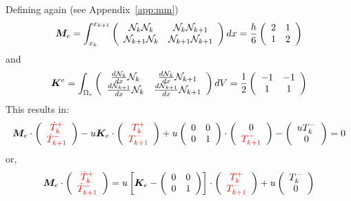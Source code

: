Defining again (see Appendix~\ref{app:mm})
\[
{\bm M}_e=
\int_{x_k}^{x_{k+1}}
\left(
\begin{array}{cc}
{\mathcal{N}}_k    {\mathcal{N}}_k & {\mathcal{N}}_k     {\mathcal{N}}_{k+1} \\
{\mathcal{N}}_{k+1}{\mathcal{N}}_k & {\mathcal{N}}_{k+1} {\mathcal{N}}_{k+1} 
\end{array}
\right)
dx
= 
\frac{h}{6}
\left(
\begin{array}{cc}
2  & 1 \\
1 & 2
\end{array}
\right)
\]
and 
\[
{\bm K}^e =
\int_{\Omega_e} 
\left(
\begin{array}{cc}
\frac{d{\mathcal{N}}_k}{dx}     {\mathcal{N}}_k & \frac{d{\mathcal{N}}_k}{dx}     {\mathcal{N}}_{k+1} \\
\frac{d{\mathcal{N}}_{k+1}}{dx} {\mathcal{N}}_k & \frac{d{\mathcal{N}}_{k+1}}{dx} {\mathcal{N}}_{k+1}
\end{array}
\right)
dV
=
\frac{1}{2}
\left(
\begin{array}{cc}
-1  & -1 \\
1 & 1
\end{array}
\right)
\]
This results in:
\begin{eqnarray}
{\bm M}_e 
\cdot
\left(
\begin{array}{cc}
{\color{red}\dot T_k^+}  \\
{\color{red} \dot T_{k+1}^-} 
\end{array}
\right) 
-u {\bm K}_e \cdot \left(
\begin{array}{cc}
     {\color{red}T_k^+}  \\
     {\color{red}T_{k+1}^-} 
\end{array}
\right) + 
u
\left( 
\begin{array}{cc}
0 & 0 \\
0 & 1 
\end{array}
\right)
\cdot
\left( 
\begin{array}{c}
0   \\
{\color{red}T_{k+1}^-} 
\end{array}
\right)
-\left(
\begin{array}{cc}
     u{T_{k}^-}   \\
     0 
\end{array}
\right)=0
\end{eqnarray}
or,
\begin{eqnarray}
{\bm M}_e \cdot
\left(
\begin{array}{cc}
{\color{red}\dot T_k^+}  \\
{\color{red} \dot T_{k+1}^-} 
\end{array}
\right) 
=
u \left[ {\bm K}_e -
\left(\begin{array}{cc}
0 & 0 \\
0 & 1 
\end{array}\right)
\right] \cdot 
\left( \begin{array}{cc}
{\color{red}T_k^+}  \\
{\color{red}T_{k+1}^-} 
\end{array} \right) 
+u \left( \begin{array}{cc}
{T_{k}^-}   \\  0 
\end{array} \right)
\end{eqnarray}


